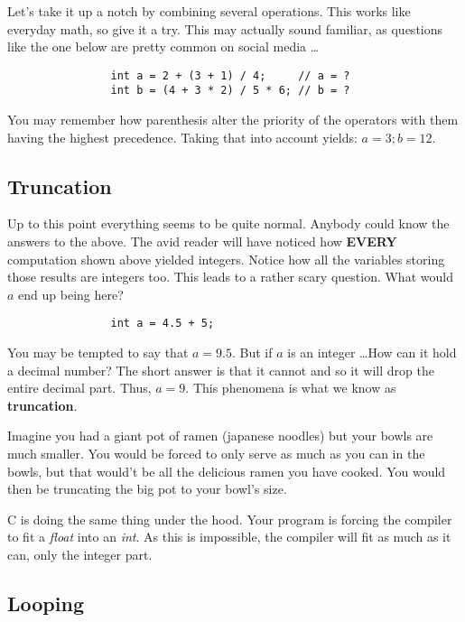 \documentclass[12pt]{book}
\begin{document}
            Let's take it up a notch by combining several operations. This works like everyday math, so give it a try. This may actually sound familiar, as questions like the one below are pretty common on social media \dots

            \begin{verbatim}
                int a = 2 + (3 + 1) / 4;     // a = ?
                int b = (4 + 3 * 2) / 5 * 6; // b = ?
            \end{verbatim}

            You may remember how parenthesis alter the priority of the operators with them having the highest precedence. Taking that into account yields: $a = 3; b = 12$.

            \subsection{Truncation}

            Up to this point everything seems to be quite normal. Anybody could know the answers to the above. The avid reader will have noticed how \textbf{EVERY} computation shown above yielded integers. Notice how all the variables storing those results are integers too. This leads to a rather scary question. What would $a$ end up being here?

            \begin{verbatim}
                int a = 4.5 + 5;
            \end{verbatim}

            You may be tempted to say that $a = 9.5$. But if $a$ is an integer \dots How can it hold a decimal number? The short answer is that it cannot and so it will drop the entire decimal part. Thus, $a = 9$. This phenomena is what we know as \textbf{truncation}.

            Imagine you had a giant pot of ramen (japanese noodles) but your bowls are much smaller. You would be forced to only serve as much as you can in the bowls, but that would't be all the delicious ramen you have cooked. You would then be truncating the big pot to your bowl's size.

            C is doing the same thing under the hood. Your program is forcing the compiler to fit a \textit{float} into an \textit{int}. As this is impossible, the compiler will fit as much as it can, only the integer part.

            \subsection{Looping}
\end{document}
